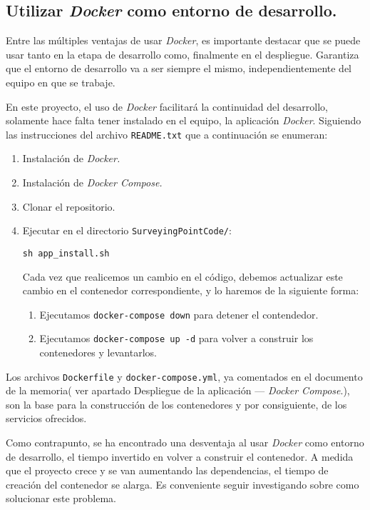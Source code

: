 \subsection{Utilizar \emph{Docker} como entorno de desarrollo.}

Entre las múltiples ventajas de usar \emph{Docker}, es importante destacar que se puede usar tanto en la etapa de desarrollo como, finalmente en el despliegue. Garantiza que el entorno de desarrollo va a ser siempre el mismo, independientemente del equipo en que se trabaje.

En este proyecto, el uso de \emph{Docker} facilitará la continuidad del desarrollo, solamente hace falta tener instalado en el equipo, la aplicación \emph{Docker}. Siguiendo las instrucciones del archivo \texttt{README.txt} que a continuación se enumeran:

\begin{enumerate}
\item Instalación de \emph{Docker.}
\item Instalación de \emph{Docker Compose.}
\item Clonar el repositorio.
\item Ejecutar en el directorio \texttt{SurveyingPointCode/}:

\texttt{sh app\_install.sh}

Cada vez que realicemos un cambio en el código, debemos actualizar este cambio en el contenedor correspondiente, y lo haremos de la siguiente forma:
\begin{enumerate}

\item Ejecutamos \texttt{docker-compose down} para detener el contendedor.

\item Ejecutamos \texttt{docker-compose up -d} para volver a construir los contenedores y levantarlos.
\end{enumerate}

\end{enumerate}

Los archivos \texttt{Dockerfile} y \texttt{docker-compose.yml}, ya comentados en el documento de la memoria( ver apartado Despliegue de la aplicación — \emph{Docker Compose}.), son la base para la construcción de los contenedores y por consiguiente, de los servicios ofrecidos. 

Como contrapunto, se ha encontrado una desventaja al usar \emph{Docker} como entorno de desarrollo, el tiempo invertido en volver a construir el contenedor. A medida que el proyecto crece y se van aumentando las dependencias, el tiempo de creación del contenedor se alarga. Es conveniente seguir investigando sobre como solucionar este problema.

